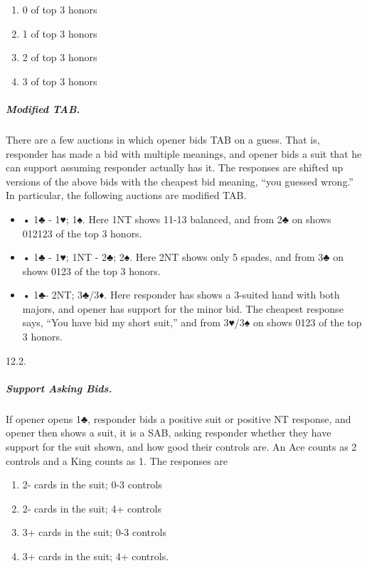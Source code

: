 \documentclass[10pt]{article}
\begin{document}
\begin{multicols*}{2}
\begin{enumerate}
\item 0 of top 3 honors
\item 1 of top 3 honors
\item 2 of top 3 honors
\item 3 of top 3 honors
\end{enumerate}

\subparagraph{Modified TAB.}

There are a few auctions in which opener bids TAB on a
guess. That is, responder has made a bid with multiple meanings, and opener bids
a suit that he can support assuming responder actually has it. The responses are
shifted up versions of the above bids with the cheapest bid meaning, “you guessed
wrong.” In particular, the following auctions are modified TAB.
\begin{itemize}
\item • 1♣ - 1♥; 1♠. Here 1NT shows 11-13 balanced, and from 2♣ on shows
012123 of the top 3 honors.
\item • 1♣ - 1♥; 1NT - 2♣; 2♠. Here 2NT shows only 5 spades, and from 3♣ on
shows 0123 of the top 3 honors.
\item • 1♣- 2NT; 3♣/3♦. Here responder has shows a 3-suited hand with both
majors, and opener has support for the minor bid. The cheapest response
says, “You have bid my short suit,” and from 3♥/3♠ on shows 0123 of the
top 3 honors.
\end{itemize}

12.2. \subparagraph{Support Asking Bids.} If opener opens 1♣, responder bids a
positive suit or positive NT response, and opener then shows a suit, it is a
SAB, asking responder whether they have support for the suit shown, and how good
their controls are. An Ace counts as 2 controls and a King counts as 1. The
responses are

\begin{enumerate}
\item 2- cards in the suit; 0-3 controls
\item 2- cards in the suit; 4+ controls
\item 3+ cards in the suit; 0-3 controls
\item 3+ cards in the suit; 4+ controls.
\end{enumerate}


\end{multicols*}
\end{document}
